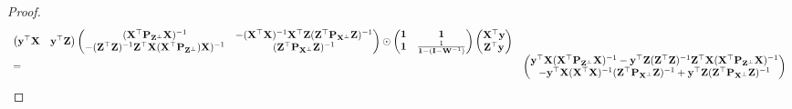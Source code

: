 \documentclass{amsart}[12pt]
\theoremstyle{definition}
\begin{document}
\begin{proof}
\begin{equation*}
\begin{array}{ll}
			\begin{pmatrix}
			{\bf y}^\top {\bf X}                                                           & {\bf y}^\top {\bf Z}                                                                                                                                                                                            
			\end{pmatrix}
			\begin{pmatrix}
			({\bf X}^\top {\bf P}_{{\bf Z}^\perp} {\bf X})^{-1}                                    & -({\bf X}^\top {\bf X})^{-1} {\bf X}^\top {\bf Z} ({\bf Z}^\top {\bf P}_{{\bf X}^\perp} {\bf Z})^{-1}                                                                                                                                   \\
			-({\bf Z}^\top {\bf Z})^{-1} {\bf Z}^\top {\bf X} ({\bf X}^\top {\bf P}_{{\bf Z}^\perp}) {\bf X})^{-1} & ({\bf Z}^\top {\bf P}_{{\bf X}^\perp} {\bf Z})^{-1}                                                                                                                                                                     
			\end{pmatrix}
			\odot
			\begin{pmatrix}
			{\bf1}                                                                  & {\bf 1}                                                                                                                                                                                                   \\
			{\bf 1}                                                                  & \frac{1}{{\bf 1} - ({\bf I} - {\bf W}^{-1})}                                                                                                                                                                      
			\end{pmatrix}
			\begin{pmatrix}
			{\bf X}^\top {\bf y}\\
			{\bf Z}^\top {\bf y}
			\end{pmatrix} \\
			=                                                                      &                                                                                                                                                                                                         
			\begin{pmatrix}
			{\bf y}^\top {\bf X}({\bf X}^\top {\bf P}_{{\bf Z}^\perp} {\bf X})^{-1} - {\bf y}^\top {\bf Z}({\bf Z}^\top {\bf Z})^{-1} {\bf Z}^\top {\bf X} ({\bf X}^\top {\bf P}_{{\bf Z}^\perp} {\bf X})^{-1}\\
			-{\bf y}^\top {\bf X}({\bf X}^\top {\bf X})^{-1} ({\bf Z}^\top {\bf P}_{{\bf X}^\perp} {\bf Z})^{-1} + {\bf y}^\top {\bf Z}({\bf Z}^\top {\bf P}_{{\bf X}^\perp} {\bf Z})^{-1}

\end{pmatrix}
\end{array}
\end{equation*}
\end{proof}
\end{document}
